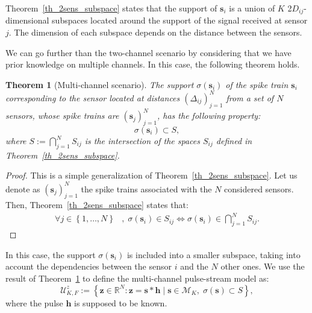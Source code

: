 \documentclass{article}
\newtheorem{theorem}{Theorem}
\newcommand{\vect}[1]{\bm{#1}}
\theoremstyle{definition}
\begin{document}
Theorem~\ref{th_2sens_subspace} states that the support of $\vect{s}_i$ is a union of $K$ \num{2}$D_{ij}$-dimensional subspaces located around the support of the signal received at sensor $j$. The dimension of each subspace depends on the distance between the sensors. 

We can go further than the two-channel scenario by considering that we have prior knowledge on multiple channels. In this case, the following theorem holds.
\begin{theorem}[Multi-channel scenario]
	\label{th_multisens_subspace}
	 The support $\sigma \left(\vect{s}_i\right)$ of the spike train $\vect{s}_i$ corresponding to the sensor located at distances $\left(\Delta_{ij}\right)_{j=1}^N$ from a set of $N$ sensors, whose spike trains are $\left(\vect{s}_j\right)_{j=1}^N$, has the following property:
	\begin{equation*}
	\sigma \left(\vect{s}_i\right) \subset S,
	\end{equation*}
	where $S := \bigcap \limits_{j=1}^{N} S_{ij} $ is the intersection of the spaces $S_{ij}$ defined in Theorem~\ref{th_2sens_subspace}.
\end{theorem}
\begin{proof}
	This is a simple generalization of Theorem~\ref{th_2sens_subspace}. Let us denote as $\left(\vect{s}_j\right)_{j=1}^N$ the spike trains associated with the $N$ considered sensors.
	Then, Theorem~\ref{th_2sens_subspace} states that:
	\begin{align*}
	 \forall j \in \left\lbrace 1,\dots,N \right \rbrace &, \; \sigma \left(\vect{s}_i\right) \in S_{ij}
	 \Leftrightarrow  \sigma \left(\vect{s}_i\right) \in \bigcap \limits_{j=1}^{N} S_{ij}. 
	\end{align*} 
\end{proof}
In this case, the support $\sigma\left(\vect{s}_i\right)$ is included into a smaller subspace, taking into account the dependencies between the sensor $i$ and the $N$ other ones. 
We use the result of Theorem~\ref{th_multisens_subspace} to define the multi-channel pulse-stream model as:
\begin{equation}
\label{eq_pulse_USstream_model}
\mathcal{U}^z_{K,F}:=\left\lbrace \vect{z} \in \mathbb{R}^N: \vect{z} = \vect{s} \ast \vect{h} \; | \;\vect{s} \in \mathcal{M}_K, \; \sigma\left(\vect{s}\right) \subset S \right\rbrace,
\end{equation} 
where the pulse $\vect{h}$ is supposed to be known. 
\end{document}
